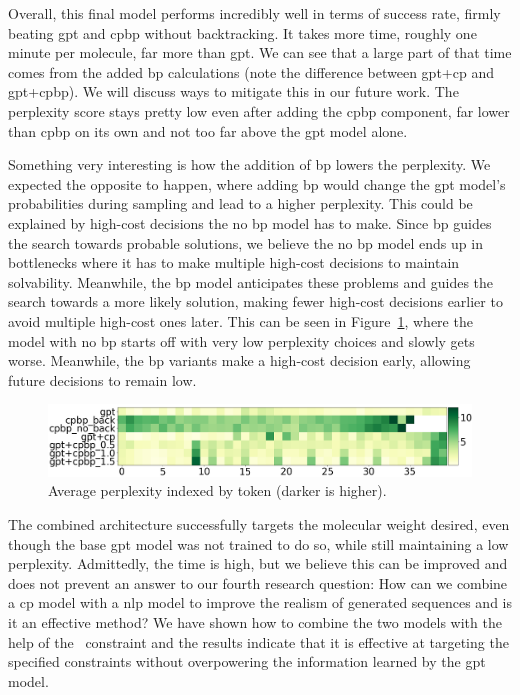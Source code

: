 \documentclass[../Document.tex]{subfiles}
\begin{document}
Overall, this final model performs incredibly well in terms of success rate, firmly beating \gls{gpt} and \gls{cpbp} without backtracking.
It takes more time, roughly one minute per molecule, far more than \gls{gpt}. We can see that a large part of that time comes from the added \gls{bp} calculations (note the difference between \gls{gpt}+\gls{cp} and \gls{gpt}+\gls{cpbp}). We will discuss ways to mitigate this in our future work.
The perplexity score stays pretty low even after adding the \gls{cpbp} component, far lower than \gls{cpbp} on its own and not too far above the \gls{gpt} model alone. 

Something very interesting is how the addition of \gls{bp} lowers the perplexity.
We expected the opposite to happen, where adding \gls{bp} would change the \gls{gpt} model's probabilities during sampling and lead to a higher perplexity.
This could be explained by high-cost decisions the no \gls{bp} model has to make.
Since \gls{bp} guides the search towards probable solutions, we believe the no \gls{bp} model ends up in bottlenecks where it has to make multiple high-cost decisions to maintain solvability. Meanwhile, the \gls{bp} model anticipates these problems and guides the search towards a more likely solution, making fewer high-cost decisions earlier to avoid multiple high-cost ones later.
This can be seen in Figure~\ref{fig:molecule-heatmap}, where the model with no \gls{bp} starts off with very low perplexity choices and slowly gets worse. Meanwhile, the \gls{bp} variants make a high-cost decision early, allowing future decisions to remain low.


\begin{figure}[h]
    \centering
    \includegraphics[width=1.0\linewidth]{images/heatmaps.png}
    \caption[Average perplexity indexed by token (darker is higher).]{Average perplexity indexed by token (darker is higher).}
    \label{fig:molecule-heatmap}
\end{figure}

The combined architecture successfully targets the molecular weight desired, even though the base \gls{gpt} model was not trained to do so, while still maintaining a low perplexity.
Admittedly, the time is high, but we believe this can be improved and does not prevent an answer to our fourth research question: How can we combine a \acrshort{cp} model with a \acrshort{nlp} model to improve the realism of generated sequences and is it an effective method?
We have shown how to combine the two models with the help of the \oracle\ constraint and the results indicate that it is effective at targeting the specified constraints without overpowering the information learned by the \gls{gpt} model.
\end{document}
